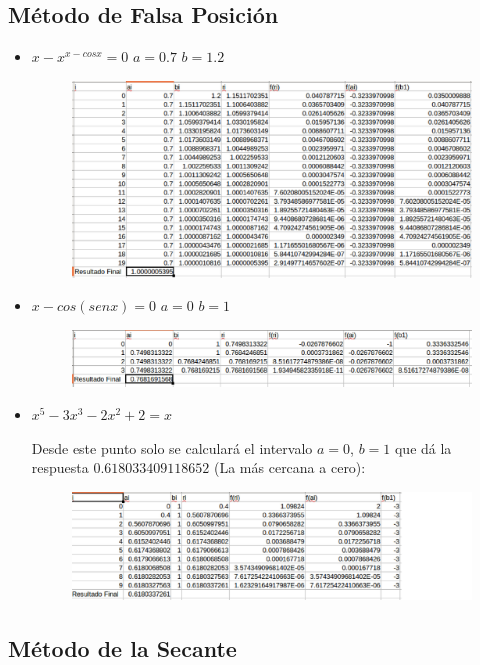 \documentclass[a4paper,12pt]{article}
\begin{document}
    
    \subsection{Método de Falsa Posición}
     
     \begin{itemize}
      \item $x-x^{x-cosx} = 0$ $a = 0.7$ $b = 1.2$
     
     \begin{figure}[h]
      \centering
      \includegraphics[scale = 0.4]{31.eps}
     \end{figure}
     
    \newpage
     
     \item $x-cos(senx) = 0$ $a = 0$ $b = 1$
     
     \vspace{4.5mm}
      
      \begin{figure}[h]
      \centering
      \includegraphics[scale = 0.4]{32.eps}
     \end{figure}

     \item $x^5 - 3x^3 - 2x^2 + 2 = x$
     
     Desde este punto solo se calculará el intervalo $a = 0$, $b = 1$ que dá la
     respuesta $0.618033409118652$ (La más cercana a cero):
     
      \begin{figure}[h]
      \centering
      \includegraphics[scale = 0.4]{33.eps}
     \end{figure}
    \end{itemize}
 
    \subsection{Método de la Secante}
    
    
\end{document}
